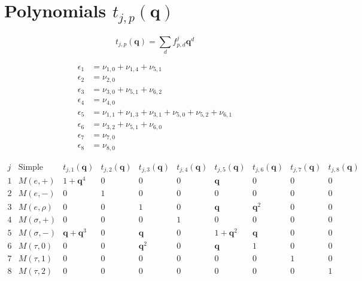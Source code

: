 \section{Polynomials $t_{j,p}(\boldsymbol{q})$}

\[
t_{j,p}(\boldsymbol{q}) = \sum_{d} f_{p,d}^{j}\boldsymbol{q}^{d}
\]

\begin{align*}
\epsilon_1 &= \nu_{1,0} + \nu_{1,4} + \nu_{5,1} \\
\epsilon_2 &= \nu_{2,0} \\
\epsilon_3 &= \nu_{3,0} + \nu_{5,1} + \nu_{6,2} \\
\epsilon_4 &= \nu_{4,0} \\
\epsilon_5 &= \nu_{1,1} + \nu_{1,3} + \nu_{3,1} + \nu_{5,0} + \nu_{5,2} + \nu_{6,1} \\
\epsilon_6 &= \nu_{3,2} + \nu_{5,1} + \nu_{6,0} \\
\epsilon_7 &= \nu_{7,0} \\
\epsilon_8 &= \nu_{8,0}
\end{align*}

\[
\begin{array}{c|c|c|c|c|c|c|c|c|c}
j & \text{Simple} & t_{j,1}(\boldsymbol{q}) & t_{j,2}(\boldsymbol{q}) & t_{j,3}(\boldsymbol{q}) & t_{j,4}(\boldsymbol{q}) & t_{j,5}(\boldsymbol{q}) & t_{j,6}(\boldsymbol{q}) & t_{j,7}(\boldsymbol{q}) & t_{j,8}(\boldsymbol{q}) \\\hline
1 & M(e,+) & 1 + \boldsymbol{q}^{4} & 0 & 0 & 0 & \boldsymbol{q} & 0 & 0 & 0 \\
2 & M(e,-) & 0 & 1 & 0 & 0 & 0 & 0 & 0 & 0 \\
3 & M(e,\rho) & 0 & 0 & 1 & 0 & \boldsymbol{q} & \boldsymbol{q}^{2} & 0 & 0 \\
4 & M(\sigma,+) & 0 & 0 & 0 & 1 & 0 & 0 & 0 & 0 \\
5 & M(\sigma,-) & \boldsymbol{q} + \boldsymbol{q}^{3} & 0 & \boldsymbol{q} & 0 & 1 + \boldsymbol{q}^{2} & \boldsymbol{q} & 0 & 0 \\
6 & M(\tau,0) & 0 & 0 & \boldsymbol{q}^{2} & 0 & \boldsymbol{q} & 1 & 0 & 0 \\
7 & M(\tau,1) & 0 & 0 & 0 & 0 & 0 & 0 & 1 & 0 \\
8 & M(\tau,2) & 0 & 0 & 0 & 0 & 0 & 0 & 0 & 1 \\
\end{array}
\]
